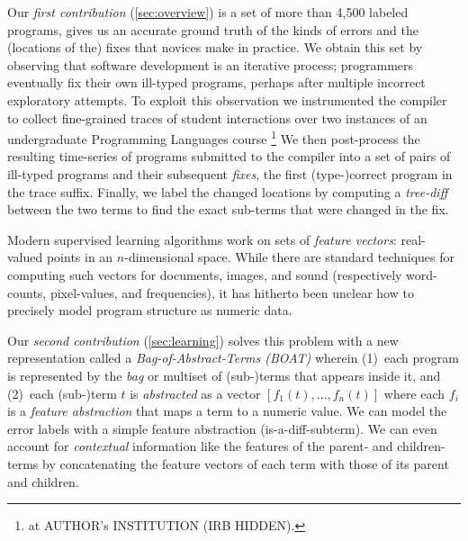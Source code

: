 Our \emph{first contribution} (\autoref{sec:overview})
is a set of more than 4,500 labeled programs,
gives us an accurate ground truth of
the kinds of errors and the (locations
of the) fixes that novices make in
practice.
%
We obtain this set by observing that
software development is an iterative
process; programmers eventually
fix their own ill-typed programs,
perhaps after multiple incorrect
exploratory attempts.
%
To exploit this observation we instrumented
the \ocaml compiler to collect fine-grained
traces of student interactions over two instances
of an undergraduate Programming Languages course
%
\footnote{
at AUTHOR's INSTITUTION (IRB HIDDEN).
}
%
We then post-process the resulting time-series
of programs submitted to the \ocaml compiler into
a set of pairs of ill-typed programs and their
subsequent \emph{fixes}, the first (type-)correct
program in the trace suffix.
%
Finally, we label the changed locations by computing a
\emph{tree-diff} between the two terms to find
the exact sub-terms that were changed in the fix.

%
Modern supervised learning algorithms work on sets of
\emph{feature vectors}: real-valued points in an
$n$-dimensional space. While there are standard
techniques for computing such
vectors for documents, images, and sound (respectively
word-counts, pixel-values, and frequencies), it has
hitherto been unclear how to precisely model program
structure as numeric data.

Our \emph{second contribution} (\autoref{sec:learning})
solves this problem with a new representation called
a \emph{Bag-of-Abstract-Terms (BOAT)} wherein
%
(1)~each program is represented by the \emph{bag}
    or multiset of (sub-)terms that appears inside
    it, and
%
(2)~each (sub-)term $t$ is \emph{abstracted} as
    a vector $[f_1(t), \ldots, f_n(t)]$ where
    each $f_i$ is a \emph{feature abstraction}
    that maps a term to a numeric value.
%
We can model the error labels with a simple feature
abstraction (\eg is-a-diff-subterm).
%
We can even account for \emph{contextual} information like
the features of the parent- and children- terms by
concatenating the feature vectors of each term with those
of its parent and children.

